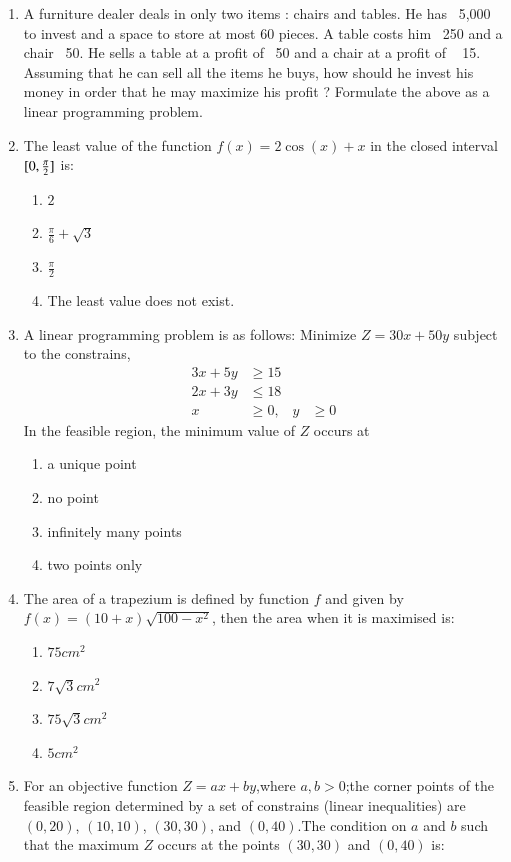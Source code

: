 \documentclass{article}
\DeclarePairedDelimiter{\mymacrosbrak}{[}{]}
\begin{document}
\begin{enumerate}
 \item A furniture dealer deals in only two items : chairs and tables. He has \rupee~5,000  to invest and a space to store at most $60$ pieces. A table costs him \rupee~250 and a chair \rupee~50. He sells a table at a profit of \rupee~50 and a chair at
a profit of \rupee~ 15. Assuming that he can sell all the items he buys, how should he invest his money in order that he may maximize his profit ?
Formulate the above as a linear programming problem.
\item The least value of the function $f(x)=2\cos(x) + x$ in the closed interval $\mymacrosbrak{0, \frac{\pi}{2}}$ is: 
\begin{enumerate}
    \item  $2$
    \item  $\frac{\pi}{6} + \sqrt{3}$
    \item  $\frac{\pi}{2}$
    \item The least value does not exist.
\end{enumerate}
\item A linear programming problem is as follows:
Minimize $Z=30x+50y$ subject to the constrains,
\begin{align}
	3x+5y &\geq 15\\
	2x+3y &\leq 18\\
	x &\geq 0, &y &\geq 0
    \end{align}
In the feasible region, the minimum value of $Z$ occurs at 
\begin{enumerate}
    \item a unique point 
    \item no point
    \item infinitely many points 
    \item two points only
\end{enumerate}
\item The area of a trapezium is defined by function $f$
and given by $f(x)=(10+x)\sqrt{100-x^2}$, then the area when it is maximised is:
\begin{enumerate}
    \item $75cm^2$
    \item $7\sqrt{3}cm^2$
    \item $75\sqrt{3}cm^2$
    \item $5cm^2$
\end{enumerate}
\item For an objective function $Z=ax+by$,where $a,b>0$;the corner points of the feasible region determined by a set of constrains (linear inequalities) are $(0,20)$, $(10,10)$, $(30,30)$, and $(0,40)$.The condition on $a$ and $b$ such that the maximum $Z$ occurs at the points $(30,30)$ and $(0,40)$ is: 

\end{enumerate}
\end{document}
